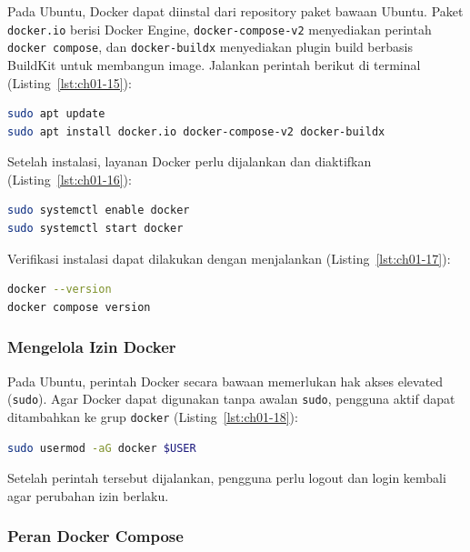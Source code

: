 Pada Ubuntu, Docker dapat diinstal dari repository paket bawaan Ubuntu. Paket
\texttt{docker.io} berisi Docker Engine, \texttt{docker-compose-v2} menyediakan
perintah \texttt{docker compose}, dan \texttt{docker-buildx} menyediakan plugin
build berbasis BuildKit untuk membangun image. Jalankan perintah berikut di terminal (Listing~\ref{lst:ch01-15}):

\begin{lstlisting}[language=bash, caption={Memasang Docker dan Docker Compose}, label={lst:ch01-15}]
sudo apt update
sudo apt install docker.io docker-compose-v2 docker-buildx
\end{lstlisting}

Setelah instalasi, layanan Docker perlu dijalankan dan diaktifkan (Listing~\ref{lst:ch01-16}):

\begin{lstlisting}[language=bash, caption={Perintah sudo systemctl enable docker}, label={lst:ch01-16}]
sudo systemctl enable docker
sudo systemctl start docker
\end{lstlisting}

Verifikasi instalasi dapat dilakukan dengan menjalankan (Listing~\ref{lst:ch01-17}):

\begin{lstlisting}[language=bash, caption={Memeriksa versi Docker (2)}, label={lst:ch01-17}]
docker --version
docker compose version
\end{lstlisting}

\subsubsection{Mengelola Izin Docker}

Pada Ubuntu, perintah Docker secara bawaan memerlukan hak akses elevated
(\texttt{sudo}). Agar Docker dapat digunakan tanpa awalan \texttt{sudo}, pengguna
aktif dapat ditambahkan ke grup \texttt{docker} (Listing~\ref{lst:ch01-18}):

\begin{lstlisting}[language=bash, caption={Perintah sudo usermod -aG docker \$USER}, label={lst:ch01-18}]
sudo usermod -aG docker $USER
\end{lstlisting}

Setelah perintah tersebut dijalankan, pengguna perlu logout dan login kembali
agar perubahan izin berlaku.


\subsubsection{Peran Docker Compose}

